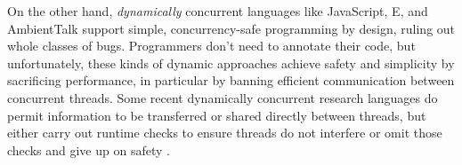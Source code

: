 %
%
%
%

On the other hand,
\textit{dynamically} concurrent languages like
JavaScript\cite{JSVAts},
E\cite{MillerPhD}, and
AmbientTalk\cite{AmbientTalk} support simple,
concurrency-safe programming by design, ruling out whole classes of
bugs.
Programmers don't need to annotate their code,
but unfortunately, these kinds of dynamic approaches achieve safety and simplicity
by sacrificing performance, in particular by banning efficient
communication between concurrent threads.
Some recent dynamically concurrent research languages do permit
information to be transferred or shared directly between threads,
but either carry out runtime checks to ensure threads do not interfere
\cite{Daloze2016,Daloze2018}
or omit those checks and give up on safety
\cite{GoConcurBugs2019,raffi2020}.




